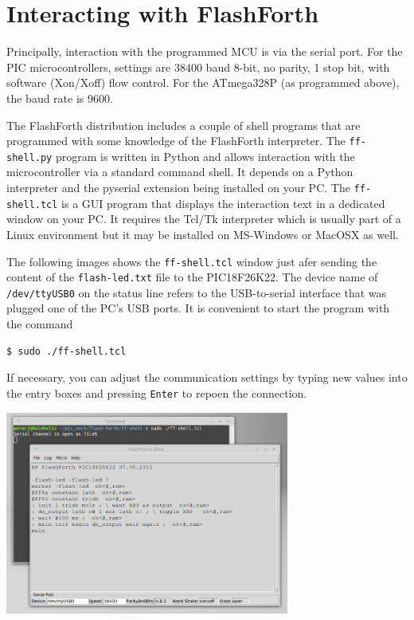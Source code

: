 \documentclass[12pt,a4paper]{article}
\begin{document}
\bigskip
\section{Interacting with FlashForth}
\label{interacting-with-flashforth-sec}
%
Principally, interaction with the programmed MCU is via the serial port.
For the PIC microcontrollers, settings are 38400 baud 8-bit, no parity, 1 stop bit, with
software (Xon/Xoff) flow control.
For the ATmega328P (as programmed above), the baud rate is 9600.

\medskip\noindent
The FlashForth distribution includes a couple of shell programs that are 
programmed with some knowledge of the FlashForth interpreter. 
The \verb!ff-shell.py! program is written in Python and allows interaction
with the microcontroller via a standard command shell.
It depends on a Python interpreter and the pyserial extension being installed on your PC.
The \verb!ff-shell.tcl! is a GUI program that displays the interaction text in a dedicated window on your PC.
It requires the Tcl/Tk interpreter which is usually part of a Linux environment but it may be
installed on MS-Windows or MacOSX as well.

\medskip\noindent
The following images shows the \verb!ff-shell.tcl! window just afer sending the content
of the \verb!flash-led.txt! file to the PIC18F26K22.
The device name of \verb!/dev/ttyUSB0! on the status line refers to the USB-to-serial interface 
that was plugged one of the PC's USB ports.
It is convenient to start the program with the command
\begin{verbatim}
$ sudo ./ff-shell.tcl 
\end{verbatim}
If necessary, you can adjust the communication settings by typing new values into the entry boxes 
and pressing \verb!Enter! to repoen the connection.

\bigskip
\noindent
\begin{center}
\includegraphics[width=0.7\textwidth]{../figs/ff-shell-tcl-flash-led-pic18.png}
\end{center}
\end{document}
